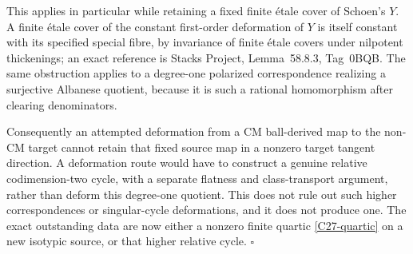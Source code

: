 This applies in particular while retaining a fixed
finite \'etale cover of Schoen's $Y$.  A finite
\'etale cover of the constant first-order deformation
of $Y$ is itself constant with its specified special
fibre, by invariance of finite \'etale covers under
nilpotent thickenings; an exact reference is Stacks
Project, Lemma~58.8.3, Tag~0BQB.
The same obstruction applies to a degree-one
polarized correspondence realizing a surjective
Albanese quotient, because it is such a rational
homomorphism after clearing denominators.

Consequently an attempted deformation from a CM
ball-derived map to the non-CM target cannot retain
that fixed source map in a nonzero target tangent
direction.  A deformation route would have to
construct a genuine relative codimension-two cycle,
with a separate flatness and class-transport argument,
rather than deform this degree-one quotient.  This
does not rule out such higher correspondences or
singular-cycle deformations, and it does not produce
one.  The exact outstanding data are now either
a nonzero finite quartic \eqref{C27-quartic} on a
new isotypic source, or that higher relative cycle.
\hfill$\square$
